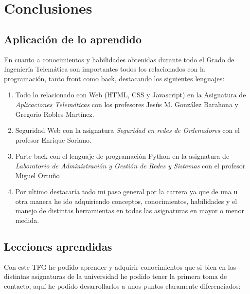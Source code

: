 \documentclass[a4paper, 12pt]{book}
\begin{document}

\cleardoublepage
\chapter{Conclusiones}
\label{chap:conclusiones}

\section{Aplicación de lo aprendido}
\label{sec:aplicacion}

En cuanto a conocimientos y habilidades obtenidas durante todo el Grado de Ingeniería Telemática son importantes todos los relacionados con la programación, tanto front como back, destacando los siguientes lenguajes:

\begin{enumerate}
  \item Todo lo relacionado con Web (HTML, CSS y Javascript) en la Asignatura de \textit{Aplicaciones Telemáticas} con los profesores Jesús M. González Barahona y Gregorio Robles Martínez.
  \item Seguridad Web con la asignatura \textit{Seguridad en redes de Ordenadores} con el profesor Enrique Soriano.
  \item Parte back con el lenguaje de programación Python en la asignatura de \textit{Laboratorio de Administración y Gestión de Redes y Sistemas} con el profesor Miguel Ortuño
  \item Por ultimo destacaría todo mi paso general por la carrera ya que de una u otra manera he ido adquiriendo conceptos, conocimientos, habilidades y el manejo de distintas herramientas en todas las asignaturas en mayor o menor medida.
\end{enumerate}


\section{Lecciones aprendidas}
\label{sec:lecciones_aprendidas}

Con este TFG he podido aprender y adquirir conocimientos que si bien en las distintas asignaturas de la universidad he podido tener la primera toma de contacto, aquí he podido desarrollarlos a unos puntos claramente diferenciados:
\end{document}
